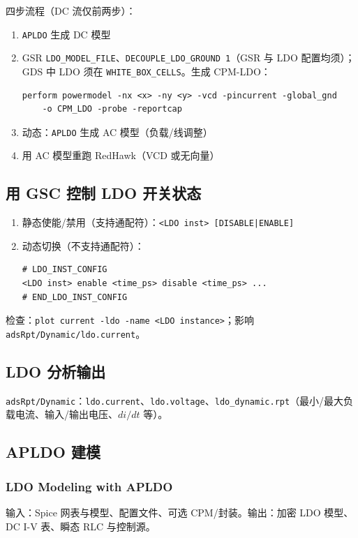 四步流程（DC 流仅前两步）：
\begin{enumerate}
  \item \texttt{APLDO} 生成 DC 模型
  \item GSR \texttt{LDO\_MODEL\_FILE}、\texttt{DECOUPLE\_LDO\_GROUND 1}（GSR 与 LDO 配置均须）；GDS 中 LDO 须在 \texttt{WHITE\_BOX\_CELLS}。生成 CPM-LDO：
\begin{lstlisting}
perform powermodel -nx <x> -ny <y> -vcd -pincurrent -global_gnd
    -o CPM_LDO -probe -reportcap
\end{lstlisting}
  \item 动态：\texttt{APLDO} 生成 AC 模型（负载/线调整）
  \item 用 AC 模型重跑 RedHawk（VCD 或无向量）
\end{enumerate}

\subsection{用 GSC 控制 LDO 开关状态}
\begin{enumerate}
  \item 静态使能/禁用（支持通配符）：\texttt{<LDO inst> [DISABLE|ENABLE]}
  \item 动态切换（不支持通配符）：
\begin{lstlisting}
# LDO_INST_CONFIG
<LDO inst> enable <time_ps> disable <time_ps> ...
# END_LDO_INST_CONFIG
\end{lstlisting}
\end{enumerate}

检查：\texttt{plot current -ldo -name <LDO instance>}；影响 \texttt{adsRpt/Dynamic/ldo.current}。

\subsection{LDO 分析输出}
\texttt{adsRpt/Dynamic}：\texttt{ldo.current}、\texttt{ldo.voltage}、\texttt{ldo\_dynamic.rpt}（最小/最大负载电流、输入/输出电压、$di/dt$ 等）。

\subsection{APLDO 建模}
\subsubsection*{LDO Modeling with APLDO}

输入：Spice 网表与模型、配置文件、可选 CPM/封装。输出：加密 LDO 模型、DC I-V 表、瞬态 RLC 与控制源。

